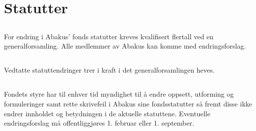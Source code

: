 \section{Statutter}

\subsection{}
For endring i Abakus’ fonds statutter kreves kvalifisert flertall ved en
generalforsamling. Alle medlemmer av Abakus kan komme med endringsforslag.

\subsection{}
Vedtatte statuttendringer trer i kraft i det generalforsamlingen heves.

\subsection{}
Fondets styre har til enhver tid myndighet til å endre oppsett, utforming og formuleringer samt rette skrivefeil i Abakus sine fondsstatutter så fremt disse ikke endrer innholdet og betydningen i de aktuelle statuttene. Eventuelle endringsforslag må offentliggjøres 1. februar eller 1. september.
